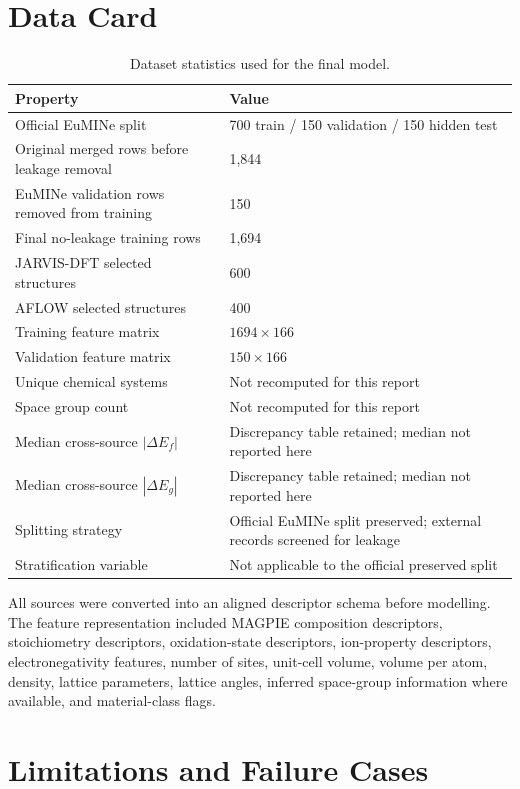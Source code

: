 \documentclass[10pt, a4paper]{article}
\begin{document}
\section{Data Card}

\begin{table}[h!]
\centering
\caption{Dataset statistics used for the final model.}
\label{tab:datacard}
\begin{tabular}{@{}ll@{}}
\toprule
Property & Value \\
\midrule
Official EuMINe split & 700 train / 150 validation / 150 hidden test \\
Original merged rows before leakage removal & 1,844 \\
EuMINe validation rows removed from training & 150 \\
Final no-leakage training rows & 1,694 \\
JARVIS-DFT selected structures & 600 \\
AFLOW selected structures & 400 \\
Training feature matrix & $1694 \times 166$ \\
Validation feature matrix & $150 \times 166$ \\
Unique chemical systems & Not recomputed for this report \\
Space group count & Not recomputed for this report \\
Median cross-source $|\Delta E_f|$ & Discrepancy table retained; median not reported here \\
Median cross-source $|\Delta E_g|$ & Discrepancy table retained; median not reported here \\
Splitting strategy & Official EuMINe split preserved; external records screened for leakage \\
Stratification variable & Not applicable to the official preserved split \\
\bottomrule
\end{tabular}
\end{table}

All sources were converted into an aligned descriptor schema before modelling. The feature representation included MAGPIE composition descriptors, stoichiometry descriptors, oxidation-state descriptors, ion-property descriptors, electronegativity features, number of sites, unit-cell volume, volume per atom, density, lattice parameters, lattice angles, inferred space-group information where available, and material-class flags.

\section{Limitations and Failure Cases}
\end{document}
